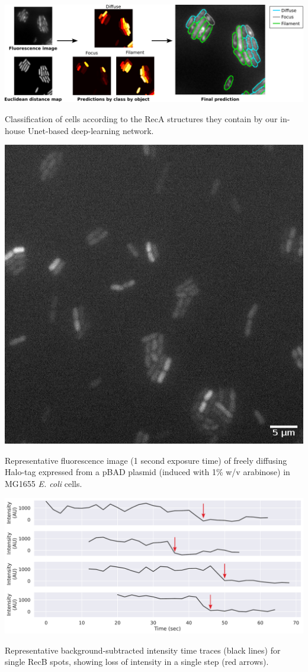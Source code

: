 \begin{suppfigure*}[htbp]
    \begin{center}
    \includegraphics[width=\textwidth]{SI_Figures/ObjectClassifier.pdf}
    \end{center}
    \caption{Classification of cells according to the RecA structures they contain by our in-house Unet-based deep-learning network.}
    \label{SIFig:object_class}
\end{suppfigure*}

\begin{suppfigure*}[htbp]
    \begin{center}
    \includegraphics[width=.5\linewidth]{SI_Figures/Free_Halo_image.png}
    \end{center}
    \caption{Representative fluorescence image (1 second exposure time) of freely diffusing Halo-tag expressed from a pBAD plasmid (induced with 1\% w/v arabinose) in MG1655 \textit{E. coli} cells.}
    \label{SIFig:freehalo_image}
\end{suppfigure*}

\begin{suppfigure*}[htbp]
    \begin{center}
    \includegraphics[width=.8\linewidth]{SI_Figures/SM_traces.pdf}
    \end{center}
    \caption{Representative background-subtracted intensity time traces (black lines) for single RecB spots, showing loss of intensity in a single step (red arrows).}
    \label{SIFig:SM_traces}
    \end{suppfigure*}

